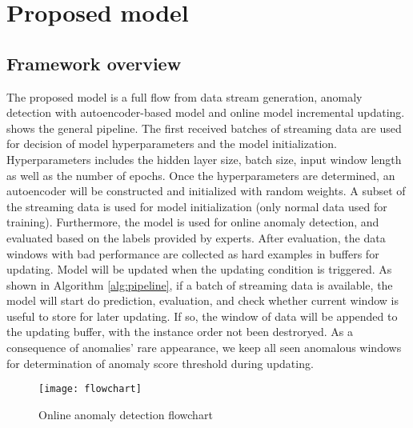 \chapter{Proposed model}
\label{chap:Proposedmodel}

\section{Framework overview}
\label{sec:framework}

The proposed model is a full flow from data stream generation, anomaly detection with autoencoder-based model and online model incremental updating.  shows the general pipeline. The first received batches of streaming data are used for decision of model hyperparameters and the model initialization. Hyperparameters includes the hidden layer size, batch size, input window length as well as the number of epochs. Once the hyperparameters are determined, an autoencoder will be constructed and initialized with random weights. A subset of the streaming data is used for model initialization (only normal data used for training). Furthermore, the model is used for online anomaly detection, and evaluated based on the labels provided by experts. After evaluation, the data windows with bad performance are collected as hard examples in buffers for updating. Model will be updated when the updating condition is triggered. As shown in Algorithm \ref{alg:pipeline}, if a batch of streaming data is available, the model will start do prediction, evaluation, and check whether current window is useful to store for later updating. If so, the window of data will be appended to the updating buffer, with the instance order not been destroryed. As a consequence of anomalies' rare appearance, we keep all seen anomalous windows for determination of anomaly score threshold during updating. 


\begin{figure}[h]
\centering
\texttt{[image: flowchart]}
\caption[Online anomaly detection flowchart]{Online anomaly detection flowchart}
\label{fig:flowchart}
\end{figure}

